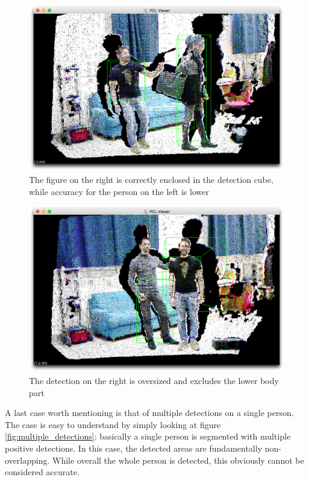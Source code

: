 \documentclass[a4paper,11pt,titlepage]{article}
\begin{document}
\begin{figure}[h]
  \centering
  \includegraphics[scale=0.2]{good_accuracy.png}
  \caption{The figure on the right is correctly enclosed in the detection cube,
  while accuracy for the person on the left is lower}
  \label{fig:good_accuracy}
\end{figure}

\begin{figure}[h]
  \centering
  \includegraphics[scale=0.2]{good_dr_but_inaccurate.png}
  \caption{The detection on the right is oversized and excludes the lower body
  part}
  \label{fig:good_dr_but_inaccurate}
\end{figure}

A last case worth mentioning is that of multiple detections on a single person.
The case is easy to understand by simply looking at figure
\ref{fig:multiple_detections}: basically a single person is segmented with
multiple positive detections. In this case, the detected areas are
fundamentally non-overlapping. While overall the whole person is detected, this
obviously cannot be considered accurate.
\end{document}
